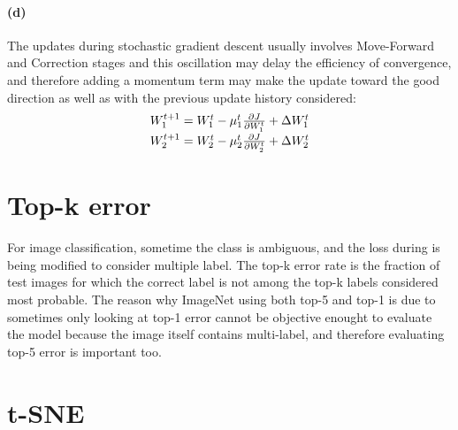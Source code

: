 \documentclass{article}
\begin{document}
\paragraph{(d)} The updates during stochastic gradient descent usually involves Move-Forward and Correction stages and this oscillation may delay the efficiency of convergence, and therefore adding a momentum term may make the update toward the good direction as well as with the previous update history considered:
\begin{equation}
\begin{matrix}
W_1^{t+1} = W_1^t - \mu_1^t {\partial J \over \partial W_1^t} + \Delta W_1^t \\[0.4em]
W_2^{t+1} = W_2^t - \mu_2^t {\partial J \over \partial W_2^t} + \Delta W_2^t
\end{matrix}
\end{equation}

\section{Top-k error}
For image classification, sometime the class is ambiguous, and the loss during is being modified to consider multiple label. The top-k error rate is the fraction of test images for which the correct label is not among the top-k labels considered most probable. The reason why ImageNet using both top-5 and top-1 is due to sometimes only looking at top-1 error cannot be objective enought to evaluate the model because the image itself contains multi-label, and therefore evaluating top-5 error is important too.

\section{t-SNE}
\end{document}
